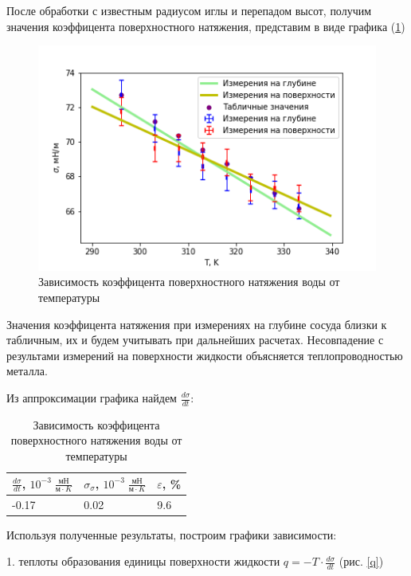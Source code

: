\documentclass[a4paper,12pt]{article} %
\begin{document}
После обработки с известным радиусом иглы и перепадом высот, получим значения коэффицента поверхностного натяжения, представим в виде графика (\ref{sigma})
\begin{figure}[h!]
\begin{center}
\includegraphics[width=\textwidth]{sigma}
\end{center}
\caption{Зависимость коэффицента поверхностного натяжения воды от температуры} \label{sigma}
\end{figure}
Значения коэффицента натяжения при измерениях на глубине сосуда близки к табличным, их и будем учитывать при дальнейших расчетах. Несовпадение с результами измерений на поверхности жидкости объясняется теплопроводностью металла. 

Из аппроксимации графика найдем $\frac{d\sigma}{dt}$:

\begin{table}[h!]
\caption{Зависимость коэффицента поверхностного натяжения воды от температуры}
\label{dsigma}
\begin{tabular}{|l|l|l|}
\hline
$\frac{d\sigma}{dt}$, $10^{-3}\; \frac{мН}{м\cdot K}$ & $\sigma_\sigma$, $10^{-3}\; \frac{мН}{м\cdot K}$ & $\varepsilon$, \%\\ \hline
-0.17         & 0.02                  & 9.6       \\ \hline
\end{tabular}
\end{table}

Используя полученные результаты, построим графики зависимости:

1. теплоты образования единицы поверхности жидкости $q = -T\cdot \frac{d\sigma}{dt}$ (рис. \ref{q})
\end{document}
